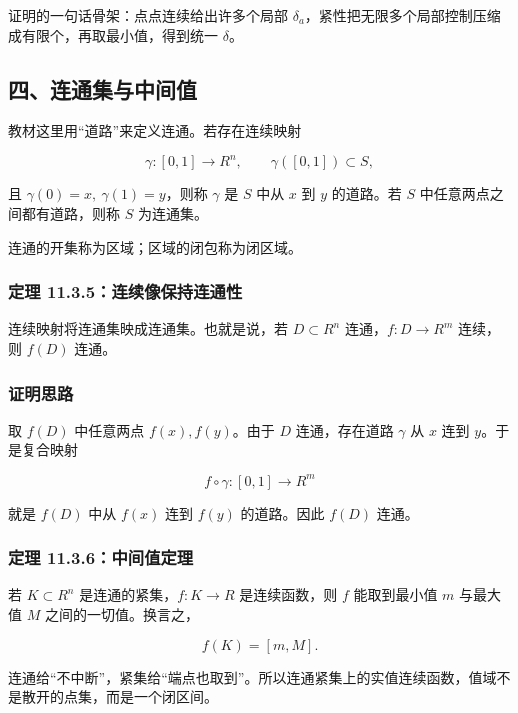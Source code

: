 \begin{notebox}
证明的一句话骨架：点点连续给出许多个局部 \(\delta_a\)，紧性把无限多个局部控制压缩成有限个，再取最小值，得到统一 \(\delta\)。
\end{notebox}

\subsection*{四、连通集与中间值}

教材这里用“道路”来定义连通。若存在连续映射

\[
      \gamma:[0,1]\to R^n,\qquad \gamma([0,1])\subset S,
    \]

且 \(\gamma(0)=x,\ \gamma(1)=y\)，则称 \(\gamma\) 是 \(S\) 中从 \(x\) 到 \(y\) 的道路。若 \(S\) 中任意两点之间都有道路，则称 \(S\) 为连通集。

连通的开集称为区域；区域的闭包称为闭区域。

\subsubsection*{定理 11.3.5：连续像保持连通性}

连续映射将连通集映成连通集。也就是说，若 \(D\subset R^n\) 连通，\(f:D\to R^m\) 连续，则 \(f(D)\) 连通。

\subsubsection*{证明思路}

取 \(f(D)\) 中任意两点 \(f(x),f(y)\)。由于 \(D\) 连通，存在道路 \(\gamma\) 从 \(x\) 连到 \(y\)。于是复合映射

\[
      f\circ\gamma:[0,1]\to R^m
    \]

就是 \(f(D)\) 中从 \(f(x)\) 连到 \(f(y)\) 的道路。因此 \(f(D)\) 连通。

\subsubsection*{定理 11.3.6：中间值定理}

若 \(K\subset R^n\) 是连通的紧集，\(f:K\to R\) 是连续函数，则 \(f\) 能取到最小值 \(m\) 与最大值 \(M\) 之间的一切值。换言之，

\[
      f(K)=[m,M].
    \]

\begin{notebox}
连通给“不中断”，紧集给“端点也取到”。所以连通紧集上的实值连续函数，值域不是散开的点集，而是一个闭区间。
\end{notebox}

